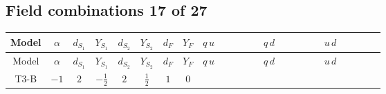 \documentclass[8pt]{article}
\begin{document}
\begin{landscape}
\subsection*{Field combinations 17 of 27}
\begin{longtable}{@{}cccccccc >{\raggedright\arraybackslash}p{0.21\linewidth} >{\raggedright\arraybackslash}p{0.21\linewidth} >{\raggedright\arraybackslash}p{0.21\linewidth}@{}}
\toprule
Model & $\alpha$ & $d_{S_1}$ & $Y_{S_1}$ & $d_{S_2}$ & $Y_{S_2}$ & $d_F$ & $Y_F$ & $q\,u$ & $q\,d$ & $u\,d$ \\
\midrule
\endfirsthead
\toprule
Model & $\alpha$ & $d_{S_1}$ & $Y_{S_1}$ & $d_{S_2}$ & $Y_{S_2}$ & $d_F$ & $Y_F$ & $q\,u$ & $q\,d$ & $u\,d$ \\
\midrule
\endhead
T3-B & $-1$ & $2$ & $-\frac{1}{2}$ & $2$ & $\frac{1}{2}$ & $1$ & $0$ & \scriptsize\adjustbox{max width=\linewidth}{$\begin{gathered} -\frac{\hbar  \overline{q_{\alpha _1,a_1,i_3}}\, \gamma ^{\mu _1}\, P_L\, q_{\alpha _1,a_1,i_3} \overline{u_{\alpha _2,i_4}}\, \gamma ^{\mu _1}\, P_R\, u_{\alpha _2,i_4} g_1^4}{540 m_1^2}\end{gathered}$} & \scriptsize\adjustbox{max width=\linewidth}{$\begin{gathered} +\frac{\hbar  \overline{d_{\alpha _1,i_3}}\, \gamma ^{\mu _1}\, P_R\, d_{\alpha _1,i_3} \overline{q_{\alpha _2,a_1,i_4}}\, \gamma ^{\mu _1}\, P_L\, q_{\alpha _2,a_1,i_4} g_1^4}{1080 m_1^2}\end{gathered}$} & \scriptsize\adjustbox{max width=\linewidth}{$\begin{gathered} +\frac{\hbar  \overline{d_{\alpha _1,i_3}}\, \gamma ^{\mu _1}\, P_R\, d_{\alpha _1,i_3} \overline{u_{\alpha _2,i_4}}\, \gamma ^{\mu _1}\, P_R\, u_{\alpha _2,i_4} g_1^4}{270 m_1^2}\end{gathered}$} \\
\midrule
\bottomrule
\end{longtable}
\clearpage

\end{landscape}
\end{document}
